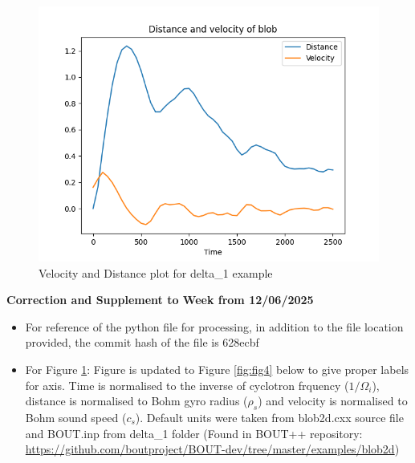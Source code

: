 \documentclass{article}
\begin{document}
\begin{arrowlist}
    \begin{figure}[H]
    \centering
        \includegraphics[height=0.4\textheight]{./Fig/Fig3 vel plot.png}
        \normalsize{\caption{Velocity and Distance plot for delta\_1 example}
        \label{fig:fig3}}
    \end{figure}   

    \item \textbf{Correction and Supplement to Week from 12/06/2025}
    \begin{itemize}
        \item For reference of the python file for processing, in addition to the file location provided, the commit hash of the file is 628ecbf
        \item For Figure \ref{fig:fig3}: Figure is updated to Figure \ref{fig:fig4} below to give proper labels for axis. Time is normalised to the inverse of cyclotron frquency ($1/\Omega_i$), distance is normalised to Bohm gyro radius ($\rho_s$) and velocity is normalised to Bohm sound speed ($c_s$). Default units were taken from blob2d.cxx source file and BOUT.inp from delta\_1 folder (Found in BOUT++ repository: \url{https://github.com/boutproject/BOUT-dev/tree/master/examples/blob2d}) 
    \end{itemize}


\end{arrowlist}
\end{document}
